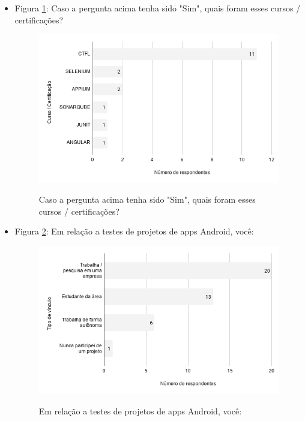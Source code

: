 \begin{itemize}
    
    \item Figura \ref{figure:s_certificacaodesc}: Caso a pergunta acima tenha sido "Sim", quais foram esses cursos / certificações?
    \begin{figure}[!htb]
    \centering
    \includegraphics[width=.80\textwidth]{images/s_certificacaodesc.png}
    \label{figure:s_certificacaodesc}
    \caption{Caso a pergunta acima tenha sido "Sim", quais foram esses cursos / certificações?}
    \end{figure}
    
    
    \item Figura \ref{figure:s_projetos}: Em relação a testes de projetos de apps Android, você:
    \begin{figure}[!htb]
    \centering
    \includegraphics[width=.80\textwidth]{images/s_projetos.png}
    \label{figure:s_projetos}
    \caption{Em relação a testes de projetos de apps Android, você:}
    \end{figure}
    

\end{itemize}
